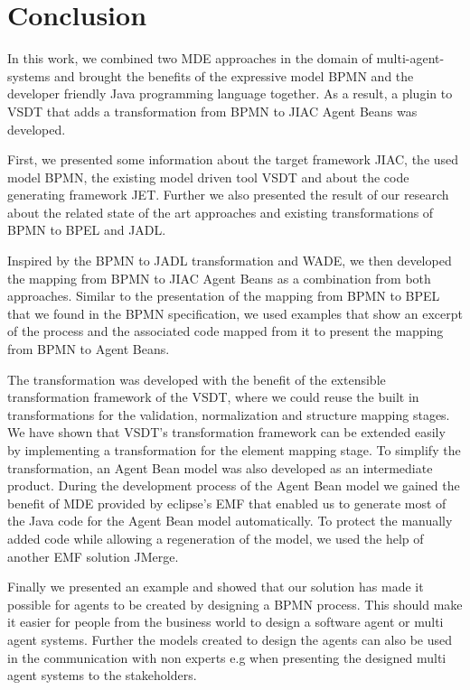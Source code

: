 \chapter{Conclusion}
\label{chap:conclusion}
In this work, we combined two MDE approaches in the domain of multi-agent-systems and brought the benefits of the expressive model BPMN and the developer friendly Java programming language together. As a result, a plugin to VSDT that adds a transformation from BPMN to JIAC Agent Beans was developed. 

First, we presented some information about the target framework JIAC, the used model BPMN, the existing model driven tool VSDT and about the code generating framework JET.  Further we also presented the result of our research about the related state of the art approaches and existing transformations of BPMN to BPEL and JADL. 

Inspired by the BPMN to JADL transformation and WADE, we then developed the mapping from BPMN to JIAC Agent Beans as a combination from both approaches. Similar to the presentation of the mapping from BPMN to BPEL that we found in the BPMN specification, we used examples that show an excerpt of the process and the associated code mapped from it to present the mapping from BPMN to Agent Beans. 

The transformation was developed with the benefit of the extensible transformation framework of the VSDT, where we could reuse the built in transformations for the validation, normalization and structure mapping stages. We have shown that VSDT's transformation framework can be extended easily by implementing a transformation for the element mapping stage. To simplify the transformation, an Agent Bean model was also developed as an intermediate product. During the development process of the Agent Bean model we gained the benefit of MDE provided by eclipse's EMF that enabled us to generate most of the Java code for the Agent Bean model automatically.
To protect the manually added code while allowing a regeneration of the model, we used the help of another EMF solution JMerge.
 
Finally we presented an example and showed that our solution has made it possible for agents to be created by designing a BPMN process. This should make it easier for people from the business world to design a software agent or multi agent systems. Further the models created to design the agents can also be used in the communication with non experts e.g when presenting the designed multi agent systems to the stakeholders.
